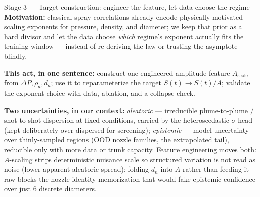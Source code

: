 \documentclass[aspectratio=169,11pt]{beamer}
\newcommand{\blue}[1]{\textcolor{aaltoBlue}{#1}}
\begin{document}
\begin{frame}{Stage 3 --- Target construction: engineer the feature, let data choose the regime}
\footnotesize
\textbf{Motivation:} classical spray correlations already encode physically-motivated scaling exponents for pressure, density, and diameter; we keep that prior as a hard divisor and let the data choose \emph{which} regime's exponent actually fits the training window --- instead of re-deriving the law or trusting the asymptote blindly.

\vspace{0.3em}
\textbf{This act, in one sentence:} construct one engineered amplitude feature $A_{\mathrm{scale}}$ from $\Delta P,\rho_a,d_n$; use it to reparameterize the target $S(t)\to S(t)/A$; validate the exponent choice with data, ablation, and a collapse check.

\vspace{0.3em}
\textbf{Two uncertainties, in our context:} \emph{aleatoric} --- irreducible plume-to-plume / shot-to-shot dispersion at fixed conditions, carried by the heteroscedastic $\sigma$ head (kept deliberately over-dispersed for screening); \emph{epistemic} --- model uncertainty over thinly-sampled regions (OOD nozzle families, the extrapolated tail), reducible only with more data or trunk capacity. \blue{Feature engineering moves both:} $A$-scaling strips deterministic nuisance scale so structured variation is not read as noise (lower apparent aleatoric spread); folding $d_n$ into $A$ rather than feeding it raw blocks the nozzle-identity memorization that would fake epistemic confidence over just 6 discrete diameters.

\end{frame}
\end{document}
